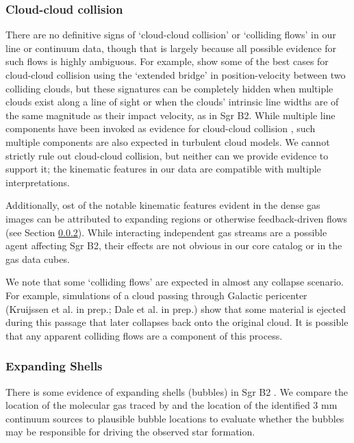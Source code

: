 \documentclass[twocolumn]{aastex61}
\begin{document}
\subsubsection{Cloud-cloud collision}
There are no definitive signs of `cloud-cloud collision' or `colliding flows'
in our line or continuum data, though that is largely because all possible
evidence for such flows is highly ambiguous. For example, \citet{Haworth2015c}
show some of the best cases for cloud-cloud collision using the `extended bridge'
in position-velocity between two colliding clouds, but these signatures can be 
completely hidden when multiple clouds exist along a line of sight or when
the clouds' intrinsic line widths are of the same magnitude as their impact velocity,
as in Sgr B2.  While multiple line components have been invoked as evidence
for cloud-cloud collision \citep{Hasegawa1994a,Corby2015a}, such multiple
components are also expected in turbulent cloud models.
We cannot strictly rule out cloud-cloud collision, but neither
can we provide evidence to support it; the kinematic features in our data are
compatible with multiple interpretations.

Additionally, ost of the notable kinematic features evident in the dense gas
images can be attributed to expanding \hii regions or otherwise feedback-driven
flows (see Section \ref{sec:expandingshells}).  While interacting independent
gas streams are a possible agent affecting Sgr B2, their effects are not
obvious in our core catalog or in the gas data cubes.

We note that some `colliding flows' are expected in almost any collapse
scenario.  For example, simulations of a cloud passing through Galactic
pericenter (Kruijssen et al. in prep.; Dale et al. in prep.) show that some
material is ejected during this passage that later collapses back onto the
original cloud.  It is possible that any apparent colliding flows
\citep[e.g.][]{Sato2000a} are a component of this process.

\subsubsection{Expanding Shells}
\label{sec:expandingshells}
There is some evidence of expanding shells (bubbles) in Sgr B2
\citep{de-Vicente1997a,Martin-Pintado1999a}.  We compare the location of the
molecular gas traced by \cyanoacetylene and the location of the identified 3 mm
continuum sources to plausible bubble locations to evaluate whether the bubbles
may be responsible for driving the observed star formation.
\end{document}
